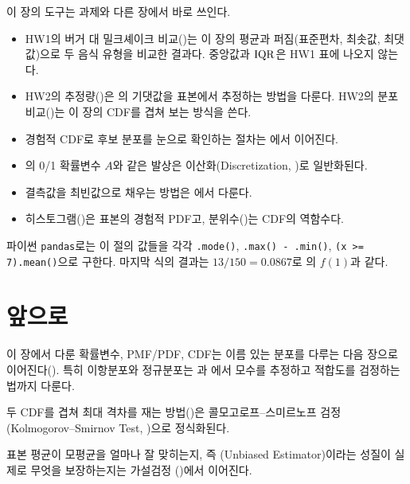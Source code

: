 이 장의 도구는 과제와 다른 장에서 바로 쓰인다.

\begin{itemize}
  \item HW1의 버거 대 밀크셰이크 비교()는
        이 장의 평균과 퍼짐(표준편차, 최솟값, 최댓값)으로 두 음식 유형을 비교한 결과다.
        중앙값과 $\mathrm{IQR}$은 HW1 표에 나오지 않는다.
  \item HW2의 추정량()은
        의 기댓값을 표본에서 추정하는
        방법을 다룬다. HW2의 분포 비교()는
        이 장의 CDF를 겹쳐 보는 방식을 쓴다.
  \item 경험적 CDF로 후보 분포를 눈으로 확인하는 절차는
        에서 이어진다.
  \item {}의 0/1 확률변수 $A$와 같은 발상은
        이산화(Discretization, )로 일반화된다.
  \item 결측값을 최빈값으로 채우는 방법은 에서 다룬다.
  \item 히스토그램()은 표본의 경험적 PDF고,
        분위수()는 CDF의 역함수다.
\end{itemize}

파이썬 \texttt{pandas}로는 이 절의 값들을 각각 \texttt{.mode()},
\texttt{.max() - .min()}, \texttt{(x >= 7).mean()}으로 구한다. 마지막
식의 결과는 $13/150 = 0.0867$로 의 $f(1)$과 같다.

\section{앞으로}
\label{sec:desc-future}

이 장에서 다룬 확률변수, PMF/PDF, CDF는 이름 있는 분포를 다루는 다음
장으로 이어진다(). 특히 이항분포와 정규분포는
과 에서 모수를 추정하고 적합도를
검정하는 법까지 다룬다.

두 CDF를 겹쳐 최대 격차를 재는 방법()은 콜모고로프--스미르노프
검정(Kolmogorov--Smirnov Test, )으로 정식화된다.

표본 평균이 모평균을 얼마나 잘 맞히는지, 즉 (Unbiased
Estimator)이라는 성질이 실제로 무엇을 보장하는지는 가설검정
()에서 이어진다.

